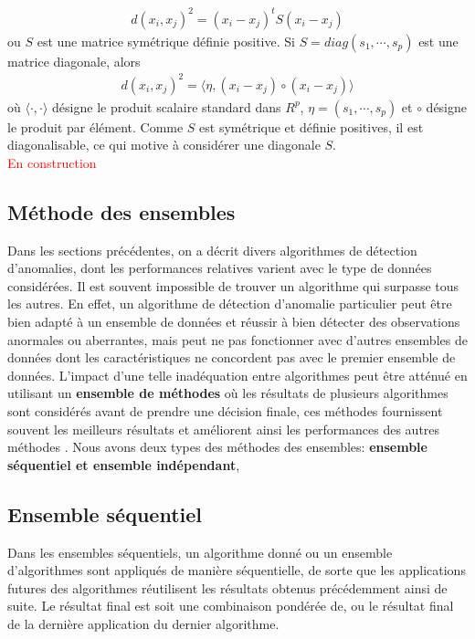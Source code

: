  \begin{align*}
 d(x_i,x_j)^2=(x_i-x_j)^tS(x_i-x_j) 
 \end{align*}
 ou $S$ est une matrice symétrique définie positive. Si $S=diag(s_1,\cdots,s_p)$ est une matrice diagonale, alors
 \begin{align*}
 d(x_i,x_j)^2=\langle\eta,(x_i-x_j)\circ(x_i-x_j) \rangle
 \end{align*} 
 où $\langle\cdot{,}\cdot\rangle$ désigne le produit scalaire  standard dans $R^p$, $\eta = (s_1,\cdots,s_p)$ et $\circ$ désigne le produit par élément. Comme $S$ est symétrique et définie positives, il est diagonalisable, ce qui motive à considérer une diagonale $S$.\\
 \textcolor{red}{En construction}\\
% 
%
\subsection{Méthode des ensembles}
%
%
Dans les sections précédentes, on a décrit divers algorithmes de détection d’anomalies, dont les performances relatives varient avec le type de données considérées. Il est souvent  impossible de trouver un algorithme qui surpasse tous les autres. En effet, un algorithme de détection d'anomalie particulier peut être bien adapté à un ensemble de données et réussir à bien détecter des observations anormales ou aberrantes, mais peut ne pas fonctionner avec d’autres ensembles de données dont les caractéristiques ne concordent pas avec le premier ensemble de données. L'impact d'une telle inadéquation  entre algorithmes peut être atténué en utilisant un \textbf{ ensemble  de méthodes} où les résultats de plusieurs algorithmes sont considérés avant de prendre une décision finale, ces méthodes fournissent souvent les meilleurs résultats et améliorent ainsi les performances des autres méthodes \cite{A10}. Nous avons deux types des méthodes des ensembles: \textbf{ensemble séquentiel et ensemble indépendant}, \newl
\subsection*{Ensemble séquentiel }
Dans les ensembles séquentiels, un algorithme donné ou un ensemble d'algorithmes sont
appliqués de manière séquentielle, de sorte que les applications futures des algorithmes
réutilisent les résultats obtenus précédemment ainsi de suite. Le résultat final est soit une combinaison pondérée de, ou le résultat final de la dernière application du dernier algorithme. 

